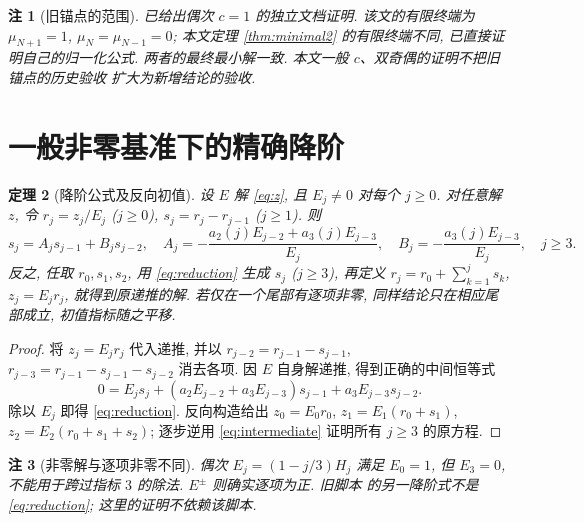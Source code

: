 \documentclass[UTF8]{ctexart}
\newtheorem{theorem}{定理}[section]
\newtheorem{remark}[theorem]{注}
\begin{document}
\begin{remark}[旧锚点的范围]
  已给出偶次 $c=1$ 的独立文档证明.
 该文的有限终端为 $\mu_{N+1}=1$, $\mu_N=\mu_{N-1}=0$;
 本文定理 \ref{thm:minimal2} 的有限终端不同, 已直接证明自己的归一化公式.
 两者的最终最小解一致. 本文一般 $c$、双奇偶的证明不把旧锚点的历史验收
 扩大为新增结论的验收.
\end{remark}

\section{一般非零基准下的精确降阶}

\begin{theorem}[降阶公式及反向初值]\label{thm:reduction}
 设 $E$ 解 \eqref{eq:z}, 且 $E_j\ne0$ 对每个 $j\ge0$.
 对任意解 $z$, 令 $r_j=z_j/E_j$ ($j\ge0$),
 $s_j=r_j-r_{j-1}$ ($j\ge1$). 则
\begin{equation}\label{eq:reduction}
 s_j=A_js_{j-1}+B_js_{j-2},\quad
 A_j=-\frac{a_2(j)E_{j-2}+a_3(j)E_{j-3}}{E_j},\quad
 B_j=-\frac{a_3(j)E_{j-3}}{E_j},\quad j\ge3.
\end{equation}
 反之, 任取 $r_0,s_1,s_2$, 用 \eqref{eq:reduction} 生成 $s_j$ ($j\ge3$),
 再定义 $r_j=r_0+\sum_{k=1}^js_k$, $z_j=E_jr_j$, 就得到原递推的解.
 若仅在一个尾部有逐项非零, 同样结论只在相应尾部成立, 初值指标随之平移.
\end{theorem}
\begin{proof}
 将 $z_j=E_jr_j$ 代入递推, 并以
 $r_{j-2}=r_{j-1}-s_{j-1}$,
 $r_{j-3}=r_{j-1}-s_{j-1}-s_{j-2}$ 消去各项.
 因 $E$ 自身解递推, 得到正确的中间恒等式
\begin{equation}\label{eq:intermediate}
 0=E_js_j+(a_2E_{j-2}+a_3E_{j-3})s_{j-1}+a_3E_{j-3}s_{j-2}.
\end{equation}
 除以 $E_j$ 即得 \eqref{eq:reduction}.
 反向构造给出 $z_0=E_0r_0$,
 $z_1=E_1(r_0+s_1)$, $z_2=E_2(r_0+s_1+s_2)$;
 逐步逆用 \eqref{eq:intermediate} 证明所有 $j\ge3$ 的原方程.
\end{proof}

\begin{remark}[非零解与逐项非零不同]
 偶次 $E_j=(1-j/3)H_j$ 满足 $E_0=1$, 但 $E_3=0$,
 不能用于跨过指标 $3$ 的除法. $E^\pm$ 则确实逐项为正.
 旧脚本  的另一降阶式不是
 \eqref{eq:reduction}; 这里的证明不依赖该脚本.
\end{remark}
\end{document}
